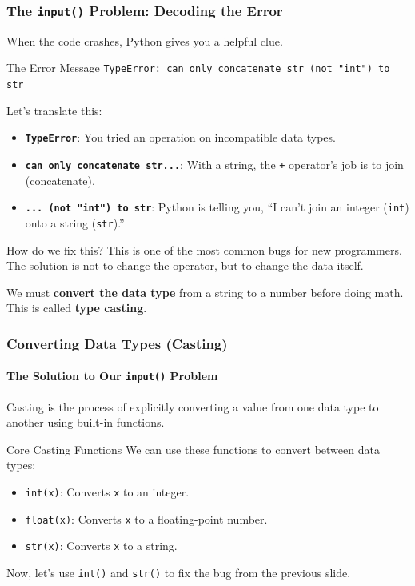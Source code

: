 \documentclass{beamer}
\begin{document}
\begin{frame}[fragile]
    \frametitle{The \texttt{input()} Problem: Decoding the Error}

    When the code crashes, Python gives you a helpful clue.
    
    \begin{alertblock}{The Error Message}
        \texttt{TypeError: can only concatenate str (not "int") to str}
    \end{alertblock}
    
    Let's translate this:
    \begin{itemize}
        \item \textbf{\texttt{TypeError}}: You tried an operation on incompatible data types.
        \item \textbf{\texttt{can only concatenate str...}}: With a string, the \texttt{+} operator's job is to join (concatenate).
        \item \textbf{\texttt{... (not "int") to str}}: Python is telling you, ``I can't join an integer (\texttt{int}) onto a string (\texttt{str}).''
    \end{itemize}
    
    \begin{block}{How do we fix this?}
        This is one of the most common bugs for new programmers. The solution is not to change the operator, but to change the data itself.
        \vspace{0.5em}
        
        We must \textbf{convert the data type} from a string to a number before doing math. This is called \textbf{type casting}.
    \end{block}

\end{frame}

\begin{frame}[fragile]
    \frametitle{Converting Data Types (Casting)}
    \framesubtitle{The Solution to Our \texttt{input()} Problem}

    Casting is the process of explicitly converting a value from one data type to another using built-in functions.
    \vspace{1em}

    \begin{block}{Core Casting Functions}
        We can use these functions to convert between data types:
        \begin{itemize}
            \item \texttt{int(x)}: Converts \texttt{x} to an integer.
            \item \texttt{float(x)}: Converts \texttt{x} to a floating-point number.
            \item \texttt{str(x)}: Converts \texttt{x} to a string.
        \end{itemize}
    \end{block}

    \vspace{1em}
    Now, let's use \texttt{int()} and \texttt{str()} to fix the bug from the previous slide.

\end{frame}
\end{document}
